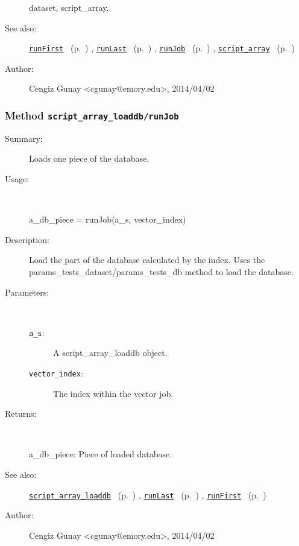 \begin{description}
	dataset, script\_array.
%
%
\item[See also:]%
\hyperlink{ref_runFirst}{\texttt{runFirst}}%
\ (p.~\pageref{ref_runFirst})%
%
, \hyperlink{ref_runLast}{\texttt{runLast}}%
\ (p.~\pageref{ref_runLast})%
%
, \hyperlink{ref_runJob}{\texttt{runJob}}%
\ (p.~\pageref{ref_runJob})%
%
, \hyperlink{ref_script_array}{\texttt{script\_array}}%
\ (p.~\pageref{ref_script_array})%
%
%
\item[Author:]%
Cengiz Gunay <cgunay@emory.edu>, 2014/04/02
%
\end{description}
\methodline%
\subsubsection[Method \texttt{runJob}]{Method \texttt{script\_array\_loaddb/runJob}}%
%
\label{ref_script_array_loaddb__runJob}%
\hypertarget{ref_script_array_loaddb__runJob}{}%
\begin{description}
\item[Summary:]Loads one piece of the database.
%
\item[Usage:]~%
\begin{lyxcode}%
a\_db\_piece = runJob(a\_s, vector\_index)
%
\end{lyxcode}%
%
\item[Description:]%
Load the part of the database calculated by the index. Uses
 the params\_tests\_dataset/params\_tests\_db method to load the database.
\item[Parameters:]~
\begin{description}%
\item[\texttt{a\_s}:]
 A script\_array\_loaddb object.
\item[\texttt{vector\_index}:]
 The index within the vector job.
\end{description}%
%
\item[Returns:
]~

   a\_db\_piece: Piece of loaded database.
%
%
\item[See also:]%
\hyperlink{ref_script_array_loaddb}{\texttt{script\_array\_loaddb}}%
\ (p.~\pageref{ref_script_array_loaddb})%
%
, \hyperlink{ref_runLast}{\texttt{runLast}}%
\ (p.~\pageref{ref_runLast})%
%
, \hyperlink{ref_runFirst}{\texttt{runFirst}}%
\ (p.~\pageref{ref_runFirst})%
%
%
\item[Author:]%
Cengiz Gunay <cgunay@emory.edu>, 2014/04/02
%
\end{description}
\methodline%
